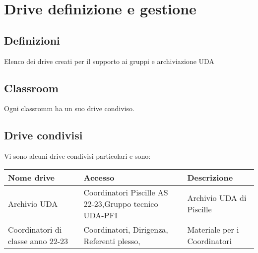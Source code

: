 \chapter{Drive definizione e gestione}
\section{Definizioni}
Elenco dei drive creati per il supporto ai gruppi e archiviazione UDA
\section{Classroom}
Ogni classromm  ha un suo drive condiviso.
\section{Drive condivisi}
Vi sono alcuni drive condivisi particolari e sono:

\begin{center}
	\begin{tabular}{p{3.2cm}p{3.2cm}p{3.2cm}}
\toprule
Nome drive	& Accesso &  Descrizione \\
\midrule
Archivio UDA\index{UDA!Archivio}	& Coordinatori Piscille AS 22-23,Gruppo tecnico UDA-PFI & Archivio UDA di Piscille \\
Coordinatori di classe anno 22-23&Coordinatori, Dirigenza, Referenti plesso, &Materiale per i Coordinatori\\
\bottomrule
\end{tabular}
\end{center}
